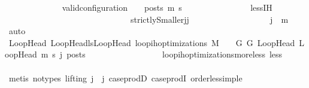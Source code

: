 \begin{isabellebody}
\ \ \ \ \ \ \ \ \ \ \ \ \isamarkupfalse%
\ {\isachardoublequoteopen}valid{\isacharunderscore}{\kern0pt}configuration\ {\isasymLambda}\ {\isasymGamma}\ {\isasymOmega}\ posts\ m{\isacharprime}{\kern0pt}\ s{\isacharprime}{\kern0pt}{\isachardoublequoteclose}\isanewline
\ \ \ \ \ \ \ \ \ \ \ \ \ \ \isamarkupfalse%
\ less{\isachardot}{\kern0pt}IH\isanewline
\ \ \ \ \ \ \ \ \ \ \ \ \isamarkupfalse%
\ {\isacharminus}{\kern0pt}\isanewline
\ \ \ \ \ \ \ \ \ \ \ \ \ \ \isamarkupfalse%
\ strictlySmaller{\isacharcolon}{\kern0pt}{\isachardoublequoteopen}j{\isacharprime}{\kern0pt}{\isacharless}{\kern0pt}j{\isachardoublequoteclose}\isanewline
\ \ \ \ \ \ \ \ \ \ \ \ \ \ \ \ \isamarkupfalse%
\ {\isachardoublequoteopen}{}{\isachardoublequoteclose}{\isacharparenleft}{\kern0pt}{}{\isacharparenright}{\kern0pt}\ {\isacartoucheopen}j{\isacharprime}{\kern0pt}\ {\isasymle}\ m{\isacartoucheclose}\ \isamarkupfalse%
\ auto\isanewline
\ \ \ \ \ \ \ \ \ \ \ \ \ \ \isamarkupfalse%
\ {\isachardoublequoteopen}{\isasymforall}{\isacharparenleft}{\kern0pt}LoopHead{\isacharcomma}{\kern0pt}\ LoopHead{\isacharprime}{\kern0pt}{\isacharparenright}{\kern0pt}{\isasymin}lsLoopHead{\isachardot}{\kern0pt}\ loop{\isacharunderscore}{\kern0pt}ih{\isacharunderscore}{\kern0pt}optimizations\ M\ {\isasymLambda}\ {\isasymGamma}\ {\isasymOmega}\ G\ G{\isacharprime}{\kern0pt}\ LoopHead\ LoopHead{\isacharprime}{\kern0pt}\ m{\isacharprime}{\kern0pt}\ s{\isacharprime}{\kern0pt}\ j{\isacharprime}{\kern0pt}\ posts{\isachardoublequoteclose}\isanewline
\ \ \ \ \ \ \ \ \ \ \ \ \ \ \ \ \isamarkupfalse%
\ loop{\isacharunderscore}{\kern0pt}ih{\isacharunderscore}{\kern0pt}optimizations{\isacharunderscore}{\kern0pt}more{\isacharunderscore}{\kern0pt}less\ less{\isacharparenleft}{\kern0pt}{}{\isacharparenright}{\kern0pt}\isanewline
\ \ \ \ \ \ \ \ \ \ \ \ \ \ \ \ \isamarkupfalse%
\ {\isacharparenleft}{\kern0pt}metis\ {\isacharparenleft}{\kern0pt}no{\isacharunderscore}{\kern0pt}types{\isacharcomma}{\kern0pt}\ lifting{\isacharparenright}{\kern0pt}\ {\isacartoucheopen}j{\isacharprime}{\kern0pt}\ {\isacharless}{\kern0pt}\ j{\isacartoucheclose}\ case{\isacharunderscore}{\kern0pt}prodD\ case{\isacharunderscore}{\kern0pt}prodI{}\ order{\isacharunderscore}{\kern0pt}less{\isacharunderscore}{\kern0pt}imp{\isacharunderscore}{\kern0pt}le{\isacharparenright}{\kern0pt}\isanewline
\ \ \ \ \ \ \ \ \ \ \ \ \ \ \isamarkupfalse%

\end{isabellebody}
